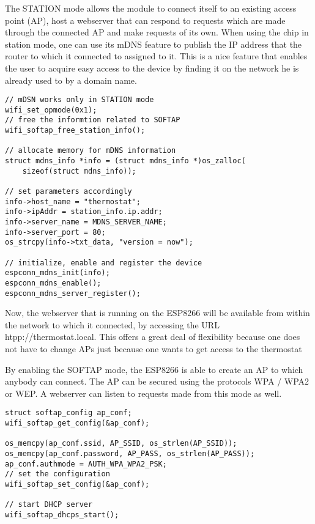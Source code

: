 \qquad The STATION mode allows the module to connect itself to an existing access point (AP), host a webserver that
can respond to requests which are made through the connected AP and make requests of its own. When using the
chip in station mode, one can use its mDNS feature to publish the IP address that the router to which it
connected to assigned to it. This is a nice feature that enables the user to acquire easy access to the device
by finding it on the network he is already used to by a domain name.

\begin{lstlisting}[frame=single]
// mDSN works only in STATION mode
wifi_set_opmode(0x1);
// free the informtion related to SOFTAP
wifi_softap_free_station_info();

// allocate memory for mDNS information
struct mdns_info *info = (struct mdns_info *)os_zalloc(
    sizeof(struct mdns_info));

// set parameters accordingly
info->host_name = "thermostat";
info->ipAddr = station_info.ip.addr;
info->server_name = MDNS_SERVER_NAME;
info->server_port = 80;
os_strcpy(info->txt_data, "version = now");

// initialize, enable and register the device
espconn_mdns_init(info);
espconn_mdns_enable();
espconn_mdns_server_register();
\end{lstlisting}

Now, the webserver that is running on the ESP8266 will be available from within the network to which it
connected, by accessing the URL htpp://thermostat.local. This offers a great deal of flexibility because one
does not have to change APs just because one wants to get access to the thermostat

By enabling the SOFTAP mode, the ESP8266 is able to create an AP to which anybody can connect. The AP can be
secured using the protocols WPA / WPA2 or WEP. A webserver can listen to requests made from this mode as well.

\begin{lstlisting}[frame=single]
struct softap_config ap_conf;
wifi_softap_get_config(&ap_conf);

os_memcpy(ap_conf.ssid, AP_SSID, os_strlen(AP_SSID));
os_memcpy(ap_conf.password, AP_PASS, os_strlen(AP_PASS));
ap_conf.authmode = AUTH_WPA_WPA2_PSK;
// set the configuration
wifi_softap_set_config(&ap_conf);

// start DHCP server
wifi_softap_dhcps_start();
\end{lstlisting}

